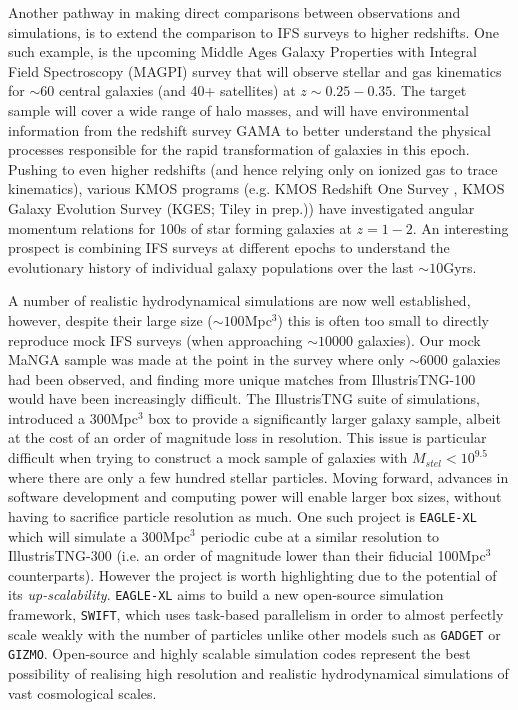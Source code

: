 Another pathway in making direct comparisons between observations and simulations, is to extend the comparison to IFS surveys to higher redshifts. One such example, is the upcoming Middle Ages Galaxy Properties with Integral Field Spectroscopy (MAGPI) survey that will observe stellar and gas kinematics for $\sim 60$ central galaxies (and 40+ satellites) at $z\sim0.25-0.35$. The target sample will cover a wide range of halo masses, and will have environmental information from the redshift survey GAMA to better understand the physical processes responsible for the rapid transformation of galaxies in this epoch. Pushing to even higher redshifts (and hence relying only on ionized gas to trace kinematics), various KMOS programs (e.g. KMOS Redshift One Survey \citep[KROSS;][]{stott2016}, KMOS Galaxy Evolution Survey (KGES; Tiley in prep.)) have investigated angular momentum relations for 100s of star forming galaxies at $z=1-2$. An interesting prospect is combining IFS surveys at different epochs \citep[e.g.][]{tiley2019} to understand the evolutionary history of individual galaxy populations over the last $\sim10$Gyrs.

A number of realistic hydrodynamical simulations are now well established, however, despite their large size ($\sim 100$Mpc$^3$) this is often too small to directly reproduce mock IFS surveys (when approaching $\sim 10000$ galaxies). Our mock MaNGA sample was made at the point in the survey where only $\sim$6000 galaxies had been observed, and finding more unique matches from IllustrisTNG-100 would have been increasingly difficult. The IllustrisTNG suite of simulations, introduced a 300Mpc$^3$ box to provide a significantly larger galaxy sample, albeit at the cost of an order of magnitude loss in resolution. This issue is particular difficult when trying to construct a mock sample of galaxies with $M_{stel} < 10^{9.5}$ where there are only a few hundred stellar particles. Moving forward, advances in software development and computing power will enable larger box sizes, without having to sacrifice particle resolution as much. One such project is \texttt{EAGLE-XL} which will simulate a 300Mpc$^{3}$ periodic cube at a similar resolution to IllustrisTNG-300 (i.e. an order of magnitude lower than their fiducial 100Mpc$^3$ counterparts). However the project is worth highlighting due to the potential of its \textit{up-scalability}. \texttt{EAGLE-XL} aims to build a new open-source simulation framework, \texttt{SWIFT}, which uses task-based parallelism in order to almost perfectly scale weakly with the number of particles unlike other models such as \texttt{GADGET} or \texttt{GIZMO}. Open-source and highly scalable simulation codes represent the best possibility of realising high resolution and realistic hydrodynamical simulations of vast cosmological scales. 